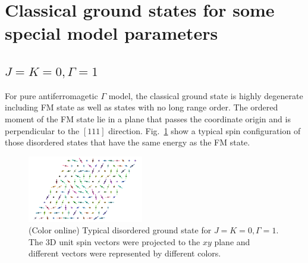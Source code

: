 \documentclass[aps,prb,reprint,amsfonts,amsmath,amssymb,showpacs,groupedaddress,superscriptaddress]{revtex4-1}
\begin{document}
\newpage
\appendix

\section{\label{apx:AppendixA}Classical ground states for some special model parameters}

\subsection{$J=K=0, \Gamma=1$}
For pure antiferromagetic $\Gamma$ model, the classical ground state is highly degenerate including FM state as well as states with no long range order. The ordered moment of the FM state lie in a plane that passes the coordinate origin and is perpendicular to the $[111]$ direction. Fig.~\ref{fig:GSForPositiveGamma} show a typical spin configuration of those disordered states that have the same energy as the FM state.
\begin{figure}
    \includegraphics[width=0.45\textwidth]{FigA1.pdf}
    \caption{\label{fig:GSForPositiveGamma}(Color online) Typical disordered ground state for $J=K=0, \Gamma=1$. The 3D unit spin vectors were projected to the $xy$ plane and different vectors were represented by different colors.}
\end{figure}
\end{document}
